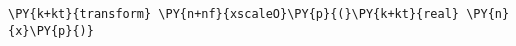 \begin{Verbatim}[commandchars=\\\{\}]
    \PY{k+kt}{transform} \PY{n+nf}{xscaleO}\PY{p}{(}\PY{k+kt}{real} \PY{n}{x}\PY{p}{)}
\end{Verbatim}
